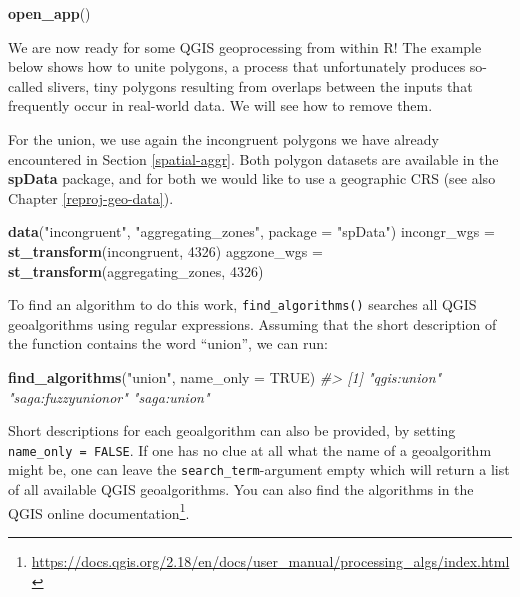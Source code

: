 \documentclass[]{krantz}
\newenvironment{Shaded}{\begin{snugshade}}{\end{snugshade}}
\newcommand{\CommentTok}[1]{\textcolor[rgb]{0.37,0.37,0.37}{\textit{#1}}}
\newcommand{\DataTypeTok}[1]{\textcolor[rgb]{0.27,0.27,0.27}{#1}}
\newcommand{\DecValTok}[1]{\textcolor[rgb]{0.06,0.06,0.06}{#1}}
\newcommand{\KeywordTok}[1]{\textcolor[rgb]{0.27,0.27,0.27}{\textbf{#1}}}
\newcommand{\NormalTok}[1]{#1}
\newcommand{\OtherTok}[1]{\textcolor[rgb]{0.37,0.37,0.37}{#1}}
\newcommand{\StringTok}[1]{\textcolor[rgb]{0.5,0.5,0.5}{#1}}
\let\rmarkdownfootnote\footnote%
\def\footnote{\protect\rmarkdownfootnote}
\renewcommand{\href}[2]{#2\footnote{\url{#1}}}
\begin{document}
\begin{Shaded}
\begin{Highlighting}[]
\KeywordTok{open_app}\NormalTok{()}
\end{Highlighting}
\end{Shaded}

We are now ready for some QGIS geoprocessing from within R!
The example below shows how to unite polygons, a process that unfortunately produces so-called slivers, tiny polygons resulting from overlaps between the inputs that frequently occur in real-world data.
We will see how to remove them.

For the union, we use again the incongruent polygons we have already encountered in Section \ref{spatial-aggr}.
Both polygon datasets are available in the \textbf{spData} package, and for both we would like to use a geographic CRS (see also Chapter \ref{reproj-geo-data}).

\begin{Shaded}
\begin{Highlighting}[]
\KeywordTok{data}\NormalTok{(}\StringTok{"incongruent"}\NormalTok{, }\StringTok{"aggregating_zones"}\NormalTok{, }\DataTypeTok{package =} \StringTok{"spData"}\NormalTok{)}
\NormalTok{incongr_wgs =}\StringTok{ }\KeywordTok{st_transform}\NormalTok{(incongruent, }\DecValTok{4326}\NormalTok{)}
\NormalTok{aggzone_wgs =}\StringTok{ }\KeywordTok{st_transform}\NormalTok{(aggregating_zones, }\DecValTok{4326}\NormalTok{)}
\end{Highlighting}
\end{Shaded}

To find an algorithm to do this work, \texttt{find\_algorithms()} searches all QGIS geoalgorithms using regular expressions.
Assuming that the short description of the function contains the word ``union'', we can run:

\begin{Shaded}
\begin{Highlighting}[]
\KeywordTok{find_algorithms}\NormalTok{(}\StringTok{"union"}\NormalTok{, }\DataTypeTok{name_only =} \OtherTok{TRUE}\NormalTok{)}
\CommentTok{#> [1] "qgis:union"        "saga:fuzzyunionor" "saga:union"}
\end{Highlighting}
\end{Shaded}

Short descriptions for each geoalgorithm can also be provided, by setting \texttt{name\_only\ =\ FALSE}.
If one has no clue at all what the name of a geoalgorithm might be, one can leave the \texttt{search\_term}-argument empty which will return a list of all available QGIS geoalgorithms.
You can also find the algorithms in the \href{https://docs.qgis.org/2.18/en/docs/user_manual/processing_algs/index.html}{QGIS online documentation}.
\end{document}

